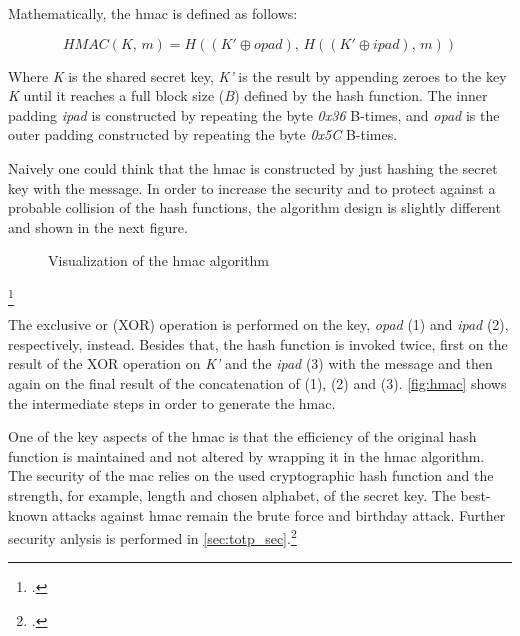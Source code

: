 Mathematically, the \gls{hmac} is defined as follows:

\begin{equation*}
	HMAC(K,\, m) = H((K' \oplus opad),\, H((K' \oplus ipad),\, m))
\end{equation*}

Where \textit{K} is the shared secret key, \textit{K'} is the result by appending zeroes to the key \textit{K} until it reaches a full block size (\textit{B}) defined by the hash function. The inner padding \textit{ipad} is constructed by repeating the byte \textit{0x36} B-times, and \textit{opad} is the outer padding constructed by repeating the byte \textit{0x5C} B-times.

Naively one could think that the \gls{hmac} is constructed by just hashing the secret key with the message. In order to increase the security and to protect against a probable collision of the hash functions, the algorithm design is slightly different and shown in the next figure.

\begin{figure}[hbt]
	\centering
	
	\caption[Visualization of the \gls{hmac} algorithm]{Visualization of the \gls{hmac} algorithm\footnotemark}
	\label{fig:hmac}
\end{figure}
\footcitetext[Source: diagram by author, based on][395]{eckert-it-sec-9}

\newpage

The exclusive or (XOR) operation is performed on the key, \textit{opad} (1) and \textit{ipad} (2), respectively, instead. Besides that, the hash function is invoked twice, first on the result of the XOR operation on \textit{K'} and the \textit{ipad} (3) with the message and then again on the final result of the concatenation of (1), (2) and (3). \autoref{fig:hmac} shows the intermediate steps in order to generate the \gls{hmac}.

One of the key aspects of the \gls{hmac} is that the efficiency of the original hash function is maintained and not altered by wrapping it in the \gls{hmac} algorithm. The security of the \gls{mac} relies on the used cryptographic hash function and the strength, for example, length and chosen alphabet, of the secret key. The best-known attacks against \gls{hmac} remain the brute force and birthday attack. Further security anlysis is performed in \autoref{sec:totp_sec}.\footcites[See][Chapter 10.4.1]{2308830}[See][398]{1679747}[See][3, 10--13]{10.1007/3-540-68697-5_1}[See][]{10.1007/3-540-44750-4_1}

